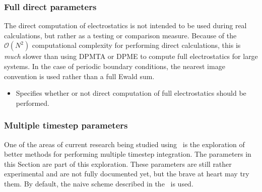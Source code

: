 \subsubsection{Full direct parameters}

The direct computation of electrostatics 
is not intended to be used during 
real calculations, but rather as a testing or 
comparison measure.  Because of the ${\mathcal O}(N^2)$ 
computational complexity for performing 
direct calculations, this is {\it much} 
slower than using DPMTA or DPME to compute full 
electrostatics for large systems.
In the case of periodic boundary conditions,
the nearest image convention is used rather than a
full Ewald sum.

\begin{itemize}

\item
{}
{Specifies whether or not direct computation of 
full electrostatics should be performed.}

\end{itemize}

\subsubsection{Multiple timestep parameters}

One of the areas of current research being studied using \NAMD\ is the
exploration of better methods for performing multiple timestep integration.
The parameters in this Section are part of this exploration.  These parameters
are still rather experimental and are not fully documented yet, but the
brave at heart may try them.  By default, the naive scheme described
in the \PG\ is used.

